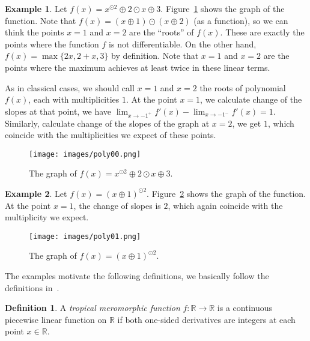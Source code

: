 \documentclass{amsart}
\theoremstyle{definition}
\newtheorem{defn}{Definition}[section]
\newtheorem{eg}{Example}[section]
\theoremstyle{remark}
\begin{document}
\begin{eg}
Let $f(x) = x^{{\odot} 2} {\oplus} 2{\odot} x {\oplus} 3$. Figure~\ref{fig:poly00} shows the graph of the function. Note that $f(x) = (x {\oplus} 1) {\odot} (x {\oplus} 2)$ (as a function), so we can think the points $x=1$ and $x=2$ are the ``roots'' of $f(x)$. These are exactly the points where the function $f$ is not differentiable. On the other hand, $f(x) = \max \{ 2x, 2+x, 3\}$ by definition. Note that $x=1$ and $x=2$ are the points where the maximum achieves at least twice in these linear terms.

As in classical cases, we should call $x=1$ and $x=2$ the roots of polynomial $f(x)$, each with multiplicities $1$. At the point $x=1$, we calculate change of the slopes at that point, we have $\lim_{x \to -1^+} f'(x) - \lim_{x \to -1^-} f'(x) = 1$. Similarly, calculate change of the slopes of the graph at $x=2$, we get $1$, which coincide with the multiplicities we expect of these points. 
\begin{figure}[h!]
\begin{center}
\texttt{[image: images/poly00.png]}
\caption{The graph of $f(x) = x^{{\odot} 2} {\oplus} 2{\odot} x {\oplus} 3$.}\label{fig:poly00}
\end{center}
\end{figure}
\end{eg}

\begin{eg}
Let $f(x) = (x {\oplus} 1)^{{\odot} 2}$. Figure~\ref{fig:poly01} shows the graph of the function. At the point $x=1$, the change of slopes is $2$, which again coincide with the multiplicity we expect. 
\begin{figure}[h!]
\begin{center}
\texttt{[image: images/poly01.png]}
\caption{The graph of $f(x) = (x {\oplus} 1)^{{\odot} 2}$.}\label{fig:poly01}
\end{center}
\end{figure}
\end{eg}

The examples motivate the following definitions, we basically follow the definitions in~\cite{hs09, lt09}.

\begin{defn}\label{defn:rmero}
A \emph{tropical meromorphic function} $f\colon {\mathbb{R}} \to {\mathbb{R}}$ is a continuous piecewise linear function on ${\mathbb{R}}$ if both one-sided derivatives are integers at each point $x \in {\mathbb{R}}$. 
\end{defn}
\end{document}
